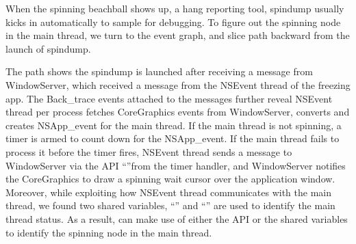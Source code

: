 \indent
When the spinning beachball shows up, a hang reporting tool, spindump usually
kicks in automatically to sample for debugging. To figure out the spinning
node in the main thread, we turn to the event graph, and slice path backward
from the launch of spindump.

The path shows the spindump is launched after receiving a message from
WindowServer, which received a message from the NSEvent thread of the freezing
app. The Back\_trace events attached to the messages further reveal NSEvent
thread per process fetches CoreGraphics events from WindowServer, converts and
creates NSApp\_event for the main thread. If the main thread is not spinning,
a timer is armed to count down for the NSApp\_event. If the main thread
fails to process it before the timer fires, NSEvent thread sends a message
to WindowServer via the API ``''from the timer
handler, and WindowServer notifies the CoreGraphics to draw a spinning wait
cursor over the application window. Moreover, while exploiting how NSEvent
thread communicates with the main thread, we found two shared variables,
``'' and ``'' are used
to identify the main thread status. As a result, \xxx can make use of either the
API or the shared variables to identify the spinning node in the main thread.
